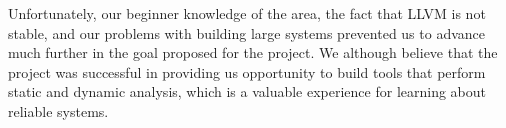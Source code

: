 \documentclass{acm_proc_article-sp}
\begin{document}
Unfortunately, our beginner knowledge of the area, the fact that LLVM is not stable, and our problems with building large systems prevented us to advance much further in the goal proposed for the project. We although believe that the project was successful in providing us opportunity to build tools that perform static and dynamic analysis, which is a valuable experience for learning about reliable systems.



%
%
\end{document}
